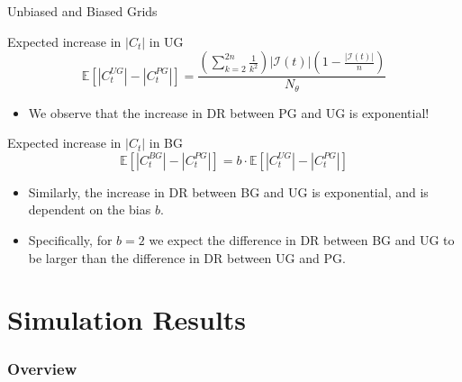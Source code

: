 \documentclass{beamer}
\begin{document}
\begin{frame}{Unbiased and Biased Grids}

\pause
\begin{block}{Expected increase in $|C_t|$ in UG}
\[
\mathbb{E}\left[{|C^{UG}_t| - |C^{PG}_t|}\right] = \frac{ \left( \sum_{k = 2}^{2n} {\frac{1}{k^2}} \right) |\mathcal{I}(t)| \left( 1 - \frac{|\mathcal{I}(t)|}{n} \right) }{N_\theta}
\]
\end{block}

\pause
\begin{itemize}
\item We observe that the increase in DR between PG and UG is exponential!
\end{itemize}

\pause
\begin{block}{Expected increase in $|C_t|$ in BG}
\[
\mathbb{E}\left[{|C^{BG}_t| - |C^{PG}_t|} \right] = b \cdot \mathbb{E}\left[{|C^{UG}_t| - |C^{PG}_t|}\right]
\]
\end{block}

\pause
\begin{itemize}
\item Similarly, the increase in DR between BG and UG is exponential, and is dependent on the bias $b$.
\pause
\item Specifically, for $b = 2$ we expect the difference in DR between BG and UG to be larger than the
difference in DR between UG and PG.
\end{itemize}

\end{frame}

\section{Simulation Results}

\begin{frame}
\frametitle{Overview} %
\tableofcontents[currentsection] %
\end{frame}
\end{document}
